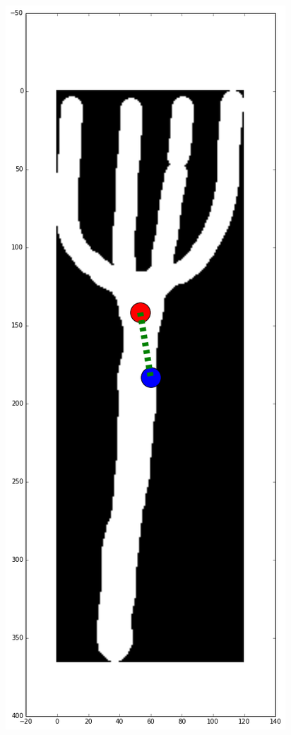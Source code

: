 \documentclass[12pt]{article}
\begin{document}
\includegraphics[scale=0.26]{fork_centroid.png}
\end{document}

